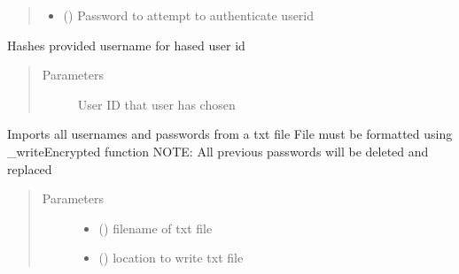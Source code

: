 \documentclass[letterpaper,10pt,english]{sphinxmanual}
\begin{document}
\begin{fulllineitems}
\begin{fulllineitems}
\begin{quote}
\begin{description}
\begin{itemize}
\item {} 
 () \textendash{} Password to attempt to authenticate userid

\end{itemize}

\end{description}\end{quote}

\end{fulllineitems}


\begin{fulllineitems}
\label{\detokenize{bank:bank.passwordAuthentication.Password.hashUsername}}
Hashes provided username for hased user id
\begin{quote}\begin{description}
\item[{Parameters}] \leavevmode
{} \textendash{} User ID that user has chosen

\end{description}\end{quote}

\end{fulllineitems}


\begin{fulllineitems}
\label{\detokenize{bank:bank.passwordAuthentication.Password.readEncrypted}}
Imports all usernames and passwords from a txt file
File must be formatted using \_writeEncrypted function
NOTE: All previous passwords will be deleted and replaced
\begin{quote}\begin{description}
\item[{Parameters}] \leavevmode\begin{itemize}
\item {} 
 () \textendash{} filename of txt file

\item {} 
 () \textendash{} location to write txt file


\end{itemize}
\end{description}
\end{quote}
\end{fulllineitems}
\end{fulllineitems}
\end{document}
